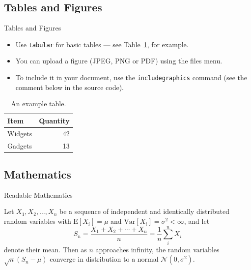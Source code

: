 \documentclass{beamer} %
\begin{document}
\subsection{Tables and Figures}

\begin{frame}{Tables and Figures}
	
	\begin{itemize}
		\item Use \texttt{tabular} for basic tables --- see Table~\ref{tab:widgets}, for example.
		\item You can upload a figure (JPEG, PNG or PDF) using the files menu. 
		\item To include it in your document, use the \texttt{includegraphics} command (see the comment below in the source code).
	\end{itemize}
	
	
	\begin{table}
		\centering
		\begin{tabular}{l|r}
			Item & Quantity \\\hline
			Widgets & 42 \\
			Gadgets & 13
		\end{tabular}
		\caption{\label{tab:widgets}An example table.}
	\end{table}
	
\end{frame}

\subsection{Mathematics}

\begin{frame}{Readable Mathematics}
	
	Let $X_1, X_2, \ldots, X_n$ be a sequence of independent and identically distributed random variables with $\text{E}[X_i] = \mu$ and $\text{Var}[X_i] = \sigma^2 < \infty$, and let
	$$S_n = \frac{X_1 + X_2 + \cdots + X_n}{n}
	= \frac{1}{n}\sum_{i}^{n} X_i$$
	denote their mean. Then as $n$ approaches infinity, the random variables $\sqrt{n}(S_n - \mu)$ converge in distribution to a normal $\mathcal{N}(0, \sigma^2)$.
	
\end{frame}
\end{document}
